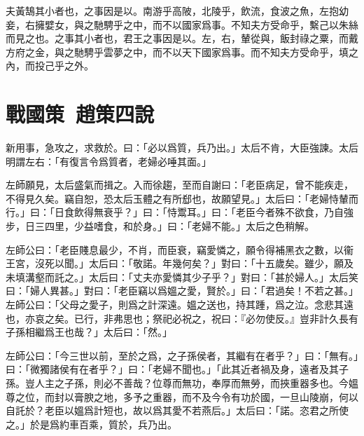 夫黃鵠其小者也，之事因是以。南游乎高陂，北陵乎，飲流，食波之魚，左抱幼妾，右擁嬖女，與之馳騁乎之中，而不以國家爲事。不知夫方受命乎，繫己以朱絲而見之也。之事其小者也，君王之事因是以。左，右，輦從與，飯封祿之粟，而戴方府之金，與之馳騁乎雲夢之中，而不以天下國家爲事。而不知夫方受命乎，填之內，而投己乎之外。

\section[觸讋說趙太后\quad{\small 戰國策\ 趙策四}]{{\normalsize 戰國策\ 趙策四}\quad {}說}
新用事，急攻之，求救於。曰：「必以爲質，兵乃出。」太后不肯，大臣強諫。太后明謂左右：「有復言令爲質者，老婦必唾其面。」

左師願見，太后盛氣而揖之。入而徐趨，至而自謝曰：「老臣病足，曾不能疾走，不得見久矣。竊自恕，恐太后玉體之有所郄也，故願望見。」太后曰：「老婦恃輦而行。」曰：「日食飲得無衰乎？」曰：「恃鬻耳。」曰：「老臣今者殊不欲食，乃自強步，日三四里，少益嗜食，和於身。」曰：「老婦不能。」太后之色稍解。

左師公曰：「老臣賤息最少，不肖，而臣衰，竊愛憐之，願令得補黑衣之數，以衞王宮，沒死以聞。」太后曰：「敬諾。年幾何矣？」對曰：「十五歲矣。雖少，願及未填溝壑而託之。」太后曰：「丈夫亦愛憐其少子乎？」對曰：「甚於婦人。」太后笑曰：「婦人異甚。」對曰：「老臣竊以爲媼之愛，賢於。」曰：「君過矣！不若之甚。」左師公曰：「父母之愛子，則爲之計深遠。媼之送也，持其踵，爲之泣。念悲其遠也，亦哀之矣。已行，非弗思也；祭祀必祝之，祝曰：『必勿使反。』豈非計久長有子孫相繼爲王也哉？」太后曰：「然。」

左師公曰：「今三世以前，至於之爲，之子孫侯者，其繼有在者乎？」曰：「無有。」曰：「微獨諸侯有在者乎？」曰：「老婦不聞也。」「此其近者禍及身，遠者及其子孫。豈人主之子孫，則必不善哉？位尊而無功，奉厚而無勞，而挾重器多也。今媼尊之位，而封以膏腴之地，多予之重器，而不及今令有功於國，一旦山陵崩，何以自託於？老臣以媼爲計短也，故以爲其愛不若燕后。」太后曰：「諾。恣君之所使之。」於是爲約車百乘，質於，兵乃出。

